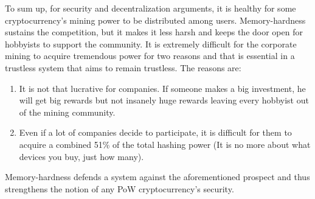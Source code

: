 To sum up, for security and decentralization arguments, it is healthy for some cryptocurrency's mining power to be distributed among users. Memory-hardness sustains the competition, but it makes it less harsh and keeps the door open for hobbyists to support the community. It is extremely difficult for the corporate mining to acquire tremendous power for two reasons and that is essential in a trustless system that aims to remain trustless. The reasons are:
\begin{enumerate}[label=(\greek*)]
  \item It is not that lucrative for companies. If someone makes a big investment, he will get big rewards but not insanely huge rewards leaving every hobbyist out of the mining community.
  \item Even if a lot of companies decide to participate, it is difficult for them to acquire a combined 51\% of the total hashing power (It is no more about what devices you buy, just how many).
\end{enumerate}

Memory-hardness defends a system against the aforementioned prospect and thus strengthens the notion of any PoW cryptocurrency's security.
